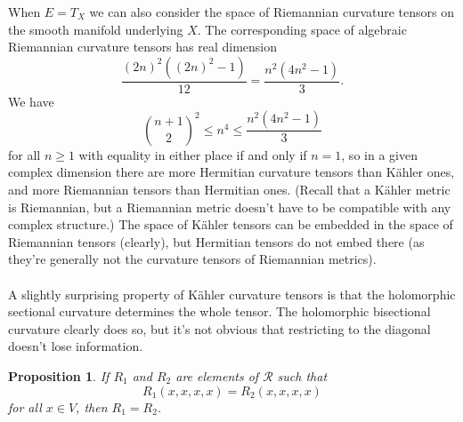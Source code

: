 \documentclass[11pt]{article}
\newtheorem{prop}[theo]{Proposition}
\newcommand{\cc}[1]{\mathcal{#1}}
\begin{document}
When $E = T_X$ we can also consider the space of Riemannian curvature tensors on the smooth manifold underlying $X$. The corresponding space of algebraic Riemannian curvature tensors has real dimension
$$
\frac{(2n)^2((2n)^2 - 1)}{12}
= \frac{n^2(4n^2 - 1)}{3}.
$$
We have
$$
\binom{n+1}{2}^2 \leq n^4 \leq \frac{n^2(4n^2 - 1)}{3}
$$
for all $n \geq 1$ with equality in either place if and only if $n = 1$, so in a given complex dimension there are more Hermitian curvature tensors than K\"ahler ones, and more Riemannian tensors than Hermitian ones. (Recall that a K\"ahler metric is Riemannian, but a Riemannian metric doesn't have to be compatible with any complex structure.) The space of K\"ahler tensors can be embedded in the space of Riemannian tensors (clearly), but Hermitian tensors do not embed there (as they're generally not the curvature tensors of Riemannian metrics).


\paragraph{}

A slightly surprising property of K\"ahler curvature tensors is that the holomorphic sectional curvature determines the whole tensor. The holomorphic bisectional curvature clearly does so, but it's not obvious that restricting to the diagonal doesn't lose information.

\begin{prop}
If $R_1$ and $R_2$ are elements of $\cc R$ such that
$$
R_1(x,x,x,x) = R_2(x,x,x,x)
$$
for all $x \in V$, then $R_1 = R_2$.
\end{prop}
\end{document}

